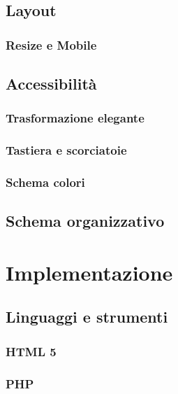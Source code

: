 \documentclass[a4paper, oneside, openany, dvipsnames, table]{article}
\begin{document}
	\subsection{Layout}
		
		\subsubsection{Resize e Mobile}
			
	\subsection{Accessibilità}
		
		\subsubsection{Trasformazione elegante}
			
		\subsubsection{Tastiera e scorciatoie}
			
		\subsubsection{Schema colori}
			
	\subsection{Schema organizzativo}
		

\newpage
\section{Implementazione}
	
	\subsection{Linguaggi e strumenti}
		
		\subsubsection{HTML 5}
			
		\subsubsection{PHP}
			
\end{document}
